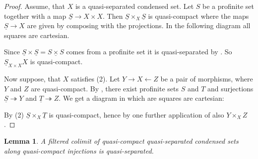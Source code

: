 \documentclass{amsart}
\newtheorem{lem}[prop]{Lemma}
\theoremstyle{definition}
\theoremstyle{remark}
\begin{document}
\begin{proof}
    Assume, that $X$ is a quasi-separated condensed set.
    Let $S$ be a profinite set together with a map $\underline S \to X \times X$. Then $\underline S \times_X \underline S$ is quasi-compact where the maps $\underline S \to X$ are given by composing with the projections.    
    In the following diagram all squares are cartesian.
    \begin{center}
    \end{center}
    Since $\underline S \times \underline S = \underline{S \times S}$ comes from a profinite set it is quasi-separated by \cite[Proposition 1.2 (3)]{ScholzeAnalytic}.
    So $\underline S_{X \times X} X$ is quasi-compact.

    Now suppose, that $X$ satisfies (2). Let $Y \to X \leftarrow Z$ be a pair of morphisms, where $Y$ and $Z$ are quasi-compact.
    By , there exist profinite sets $S$ and $T$ and surjections $\underline S \twoheadrightarrow Y$ and $\underline T \twoheadrightarrow Z$.
    We get a diagram in which are squares are cartesian:
    \begin{center}
    \end{center}
    By (2) $\underline S \times_X \underline T$ is quasi-compact, hence by one further application of  also $Y \times_X Z$.
\end{proof}

\begin{lem}\label{injlimisqs}
    A filtered colimit of quasi-compact quasi-separated condensed sets along quasi-compact injections is quasi-separated.
\end{lem}
\end{document}

